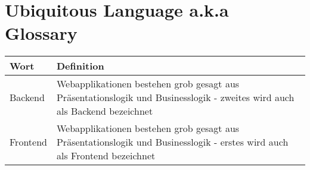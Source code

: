 \chapter{Ubiquitous Language a.k.a Glossary}
\begin{tabular}{ |  p{4cm}  |  p{9cm} |}
  \hline
  Wort & Definition\\
  \hline
 	Backend & Webapplikationen bestehen grob gesagt aus Pr\"asentationslogik und Businesslogik - zweites wird auch als Backend bezeichnet \\\hline
 	Frontend & Webapplikationen bestehen grob gesagt aus Pr\"asentationslogik und Businesslogik - erstes wird auch als Frontend bezeichnet \\\hline  
\end{tabular}
